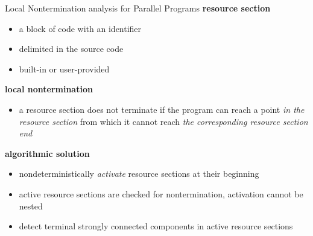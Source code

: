 \documentclass[aspectratio=169, fi]{paradise-slide}
\newcommand{\xtso}{\mbox{x86-\kern-.15em TSO}\xspace}
\newenvironment{prespart}[1]{%
  \begin{frame}{}%
    \centering
      {\Large #1} \par\bigskip\bigskip%
}{%
  \end{frame}%
}
\begin{document}
\begin{frame}[fragile]{Local Nontermination analysis for Parallel Programs}
    \textbf{resource section}
    \begin{itemize}
      \item a block of code with an identifier
      \item delimited in the source code
      \item built-in or user-provided
    \end{itemize}
    \pause

    \bigskip
    \textbf{local nontermination}
    \begin{itemize}
      \item a resource section does not terminate if the program can reach a point \emph{in the
        resource section} from which it cannot reach \emph{the corresponding resource section end}
    \end{itemize}
    \pause

    \bigskip
    \textbf{algorithmic solution}
    \begin{itemize}
      \item nondeterministically \emph{activate} resource sections at their beginning
      \item active resource sections are checked for nontermination, activation cannot be nested
      \item detect terminal strongly connected components in active resource sections
    \end{itemize}
\end{frame}

\newenvironment{Conclusion}{
\begin{prespart}{Conclusion}
  \begin{itemize}
    \item contributions to analysis of programs in C++
      \begin{itemize}
        \item realistic programs, exceptions in C++
          \\ – \emph{new approach to implementation of exceptions that reuses existing libraries}
          \medskip\pause
        \item programs running under the \xtso memory model
          \\ – \emph{new efficient way to simulate \xtso using an explicit-state model checker}
          \medskip\pause
        \item local nontermination detection
          \\ – \emph{new technique that can detect that a part of the program which is supposed to
          terminate does not}
          \medskip\pause
      \end{itemize}
    \item all published, implemented in DIVINE and evaluated
  \end{itemize}
}{\end{prespart}}
\end{document}
